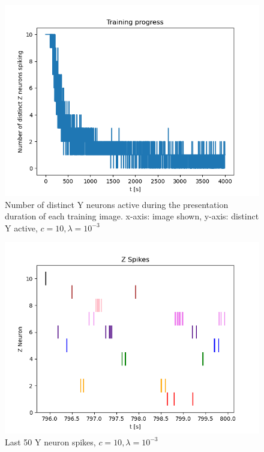 \begin{figure}
  \includegraphics[width=\linewidth]{figures/angleNetwork/c10_3distinctZ.png}
  \caption{Number of distinct Y neurons active during the presentation duration of each training image. x-axis: image shown, y-axis: distinct Y active, $c = 10, \lambda = 10^{-3}$}
  \label{fig:c10Distinct}
\end{figure}

\begin{figure}
  \includegraphics[width=\linewidth]{figures/angleNetwork/c10_3_50LastZSpikes.png}
  \caption{Last 50 Y neuron spikes, $c = 10, \lambda = 10^{-3}$}
  \label{fig:c10LastSpikes}
\end{figure}

